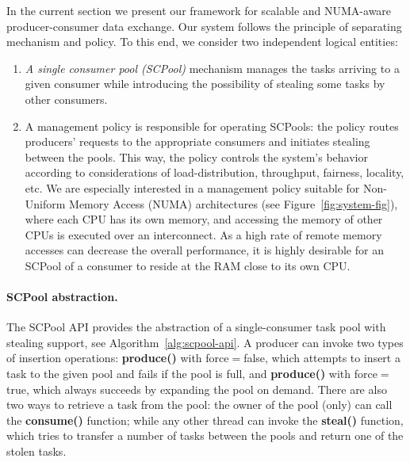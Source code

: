 In the current section we present our framework for scalable and NUMA-aware producer-consumer data exchange. 
Our system follows the principle of separating mechanism and policy.
To this end, we consider two independent logical entities: 
\begin{enumerate}
	\item \emph{A single consumer pool (SCPool)} mechanism manages the tasks arriving to a given consumer while introducing the possibility of stealing some tasks by other consumers.
	\item A management policy is responsible for operating SCPools: the policy routes producers' requests to the appropriate consumers and initiates stealing between the pools. This way, the policy controls the system's behavior according to considerations of load-distribution, throughput, fairness, locality, etc.
	We are especially interested in a management policy suitable for Non-Uniform Memory Access (NUMA) architectures (see Figure~\ref{fig:system-fig}), where each CPU has its own memory, and accessing the memory of other CPUs is executed over an interconnect. As a high rate of remote memory accesses can decrease the overall performance, it is highly desirable for an SCPool of a consumer to reside at the RAM close to its own CPU. 
\end{enumerate} 

\paragraph{SCPool abstraction.}

The SCPool API provides the abstraction of a single-consumer task pool with stealing support, see Algorithm~\ref{alg:scpool-api}.
A producer can invoke two types of insertion operations: {\bf produce()} with force$=$false, which attempts to insert a task to the given pool and fails if the pool is full, and {\bf produce()} with force$=$true, which always succeeds by expanding the pool on demand.
There are also two ways to retrieve a task from the pool: the owner of the pool (only) can call the {\bf consume()} function; while any other thread can invoke the {\bf steal()} function, which tries to transfer a number of tasks between the pools and return one of the stolen tasks. 

